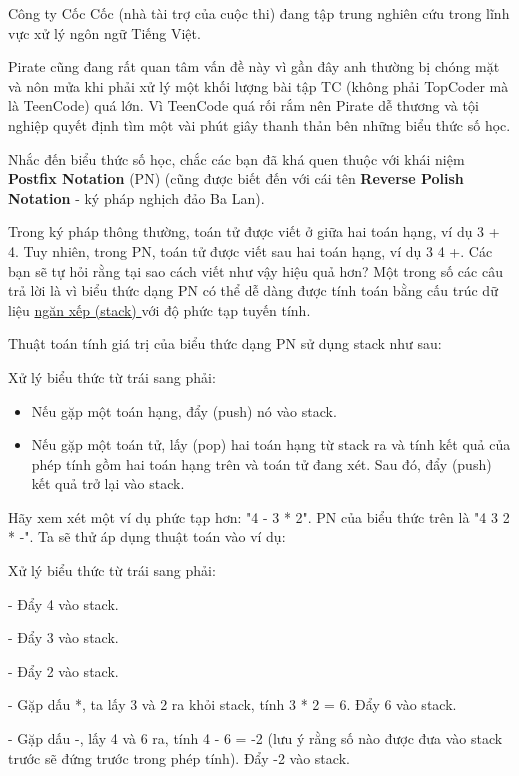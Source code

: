 Công ty Cốc Cốc (nhà tài trợ của cuộc thi) đang tập trung nghiên cứu trong lĩnh vực xử lý ngôn ngữ Tiếng Việt.  

   Pirate cũng đang rất quan tâm vấn đề này vì gần đây anh thường bị chóng mặt và nôn mửa khi phải xử lý một khối lượng bài tập TC (không phải TopCoder mà là TeenCode) quá lớn. Vì TeenCode quá rối rắm nên Pirate dễ thương và tội nghiệp quyết định tìm một vài phút giây thanh thản bên những biểu thức số học.  

   Nhắc đến biểu thức số học, chắc các bạn đã khá quen thuộc với khái niệm   \textbf{    Postfix Notation   }   (PN) (cũng được biết đến với cái tên   \textbf{    Reverse Polish Notation   }   - ký pháp nghịch đảo Ba Lan).  

   Trong ký pháp thông thường, toán tử được viết ở giữa hai toán hạng, ví dụ 3 + 4. Tuy nhiên, trong PN, toán tử được viết sau hai toán hạng, ví dụ 3 4 +. Các bạn sẽ tự hỏi rằng tại sao cách viết như vậy hiệu quả hơn? Một trong số các câu trả lời là vì biểu thức dạng PN có thể dễ dàng được tính toán bằng cấu trúc dữ liệu   \href{http://www.cosc.canterbury.ac.nz/mukundan/dsal/StackAppl.html}{    ngăn xếp (stack)   }   với độ phức tạp tuyến tính.  

   Thuật toán tính giá trị của biểu thức dạng PN sử dụng stack như sau:  

Xử lý biểu thức từ trái sang phải:
\begin{itemize}
	\item Nếu gặp một toán hạng, đẩy (push) nó vào stack.
	\item Nếu gặp một toán tử, lấy (pop) hai toán hạng từ stack ra và tính kết quả của phép tính gồm hai toán hạng trên và toán tử đang xét. Sau đó, đẩy (push) kết quả trở lại vào stack.
\end{itemize}

   Hãy xem xét một ví dụ phức tạp hơn: "4 - 3 * 2". PN của biểu thức trên là "4 3 2 * -". Ta sẽ thử áp dụng thuật toán vào ví dụ:  

Xử lý biểu thức từ trái sang phải:

- Đẩy 4 vào stack.

- Đẩy 3 vào stack.

- Đẩy 2 vào stack.

- Gặp dấu *, ta lấy 3 và 2 ra khỏi stack, tính 3 * 2 = 6. Đẩy 6 vào stack.

- Gặp dấu -, lấy 4 và 6 ra, tính 4 - 6 = -2 (lưu ý rằng số nào được đưa vào stack trước sẽ đứng trước trong phép tính). Đẩy -2 vào stack.

